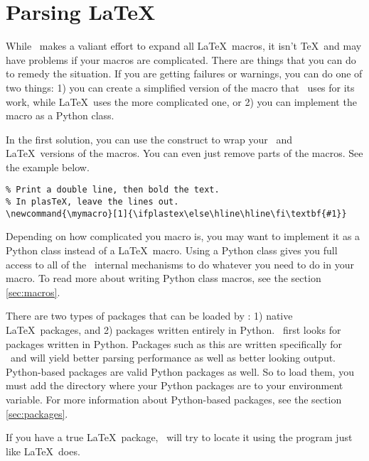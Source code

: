 
\section{Parsing \LaTeX}


While \plasTeX\ makes a valiant effort 
to expand all \LaTeX\ macros, it isn't \TeX\ and may have problems if 
your macros are complicated.  There are things that you can do to remedy the 
situation.  If you are getting failures or warnings, you can do one of two 
things: 1) you can create a simplified version of the macro that \plasTeX\ uses
for its work, while \LaTeX\ uses the more complicated one, or 2) you
can implement the macro as a Python class. 

In the first solution, you can use the  construct to wrap
your \plasTeX\ and \LaTeX\ versions of the macros.  You can even just remove 
parts of the macros.  See the example below.

\begin{verbatim}
% Print a double line, then bold the text.  
% In plasTeX, leave the lines out.
\newcommand{\mymacro}[1]{\ifplastex\else\hline\hline\fi\textbf{#1}}
\end{verbatim}

Depending on how complicated you macro is, you may want to implement it
as a Python class instead of a \LaTeX\ macro.  Using a Python class 
gives you full access to all of the \plasTeX\ internal mechanisms to 
do whatever you need to do in your macro.  To read more about writing
Python class macros, see the section \ref{sec:macros}.


There are two types of packages that can be loaded by \plasTeX: 1) native
\LaTeX\ packages, and 2) packages written entirely in Python.  \plasTeX\
first looks for packages written in Python.  Packages such as this are
written specifically for \plasTeX\ and will yield better parsing performance
as well as better looking output.  Python-based packages are valid Python
packages as well.  So to load them, you must add the directory where
your Python packages are to your \envvar{PYTHONPATH} environment variable.
For more information about Python-based packages, see the section
\ref{sec:packages}.

If you have a true \LaTeX\ package, \plasTeX\ will try to locate it using
the \program{kpsewhich} program just like \LaTeX\ does.
